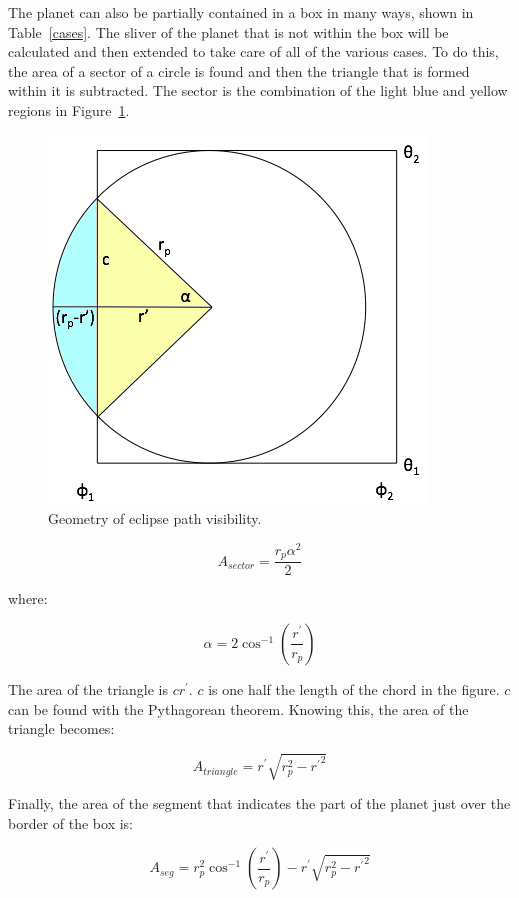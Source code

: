 \documentclass[iop]{emulateapj}
\begin{document}
The planet can also be partially contained in a box in many ways, shown in Table~\ref{cases}. The sliver of the planet that is not within the box will be calculated and then extended to take care of all of the various cases. To do this, the area of a sector of a circle is found and then the triangle that is formed within it is subtracted. The sector is the combination of the light blue and yellow regions in Figure~\ref{eclipse}.
\begin{figure}[h]
	\centering
	\includegraphics[width=.5\textwidth]{images/figure.png}
	\caption{Geometry of eclipse path visibility.}
	\label{eclipse}
\end{figure}

\begin{equation}
	A_{sector} = \frac{r_p \alpha^2}{2}
\end{equation}

where:

\begin{equation}
	\alpha = 2 \cos^{-1}\left(\frac{r^{\prime}}{r_p}\right)
\end{equation}

The area of the triangle is $cr^{\prime}$. $c$ is one half the length of the chord in the figure. $c$ can be found with the Pythagorean theorem. Knowing this, the area of the triangle becomes: 

\begin{equation}
	A_{triangle} = r^{\prime}\sqrt{r_p^2 - {r^{\prime}}^2}
\end{equation}

Finally, the area of the segment that indicates the part of the planet just over the border of the box is:

\begin{equation}
	A_{seg} = r_p^2 \cos^{-1}\left(\frac{r^{\prime}}{r_p}\right) - r^{\prime} \sqrt{r_p^2 - {r^{\prime}}^2}
\end{equation}
\end{document}
